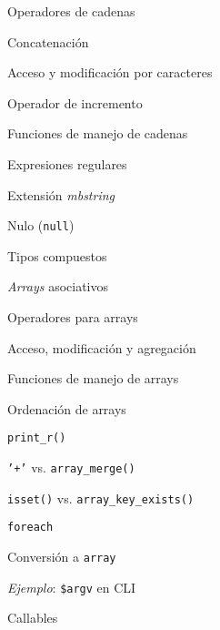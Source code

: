 \begin{longenum}
\begin{longenum}
\begin{longenum}
\begin{longenum}
                \item Operadores de cadenas
                \begin{longenum}
                    \item Concatenación
                    \item Acceso y modificación por caracteres
                    \item Operador de incremento \opcional\
                \end{longenum}
                \item Funciones de manejo de cadenas
                \item Expresiones regulares
                \item Extensión \textit{mbstring}
            \end{longenum}
            \item Nulo (\texttt{null})
        \end{longenum}
        \item Tipos compuestos
        \begin{longenum}
            \item \textit{Arrays} asociativos
            \begin{longenum}
                \item Operadores para arrays
                \begin{longenum}
                    \item Acceso, modificación y agregación
                \end{longenum}
                \item Funciones de manejo de arrays
                \begin{longenum}
                    \item Ordenación de arrays
                    \item \texttt{print\_r()}
                    \item \texttt{'+'} vs. \texttt{array\_merge()}
                    \item \texttt{isset()} vs. \texttt{array\_key\_exists()}
                \end{longenum}
                \item \texttt{foreach}
                \item Conversión a \texttt{array}
                \item \textit{Ejemplo}: \texttt{\$argv} en CLI
            \end{longenum}
            \item Callables

\end{longenum}
\end{longenum}
\end{longenum}
